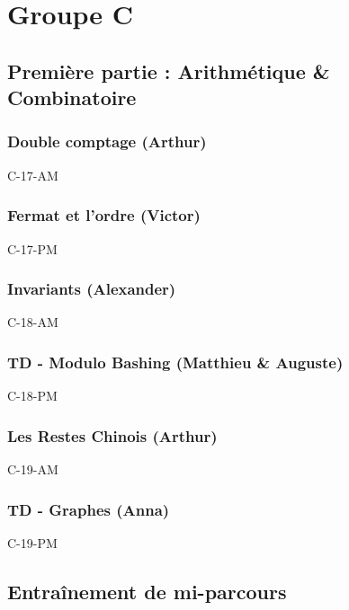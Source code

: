 \documentclass[poly,trombi]{valbonne}
\begin{document}
\chapter{Groupe C}

\minitoc \clearpage

\section{Première partie : Arithmétique \& Combinatoire}

\subsection{Double comptage (Arthur)}

{C-17-AM}

\subsection{Fermat et l'ordre (Victor)}

{C-17-PM}

\subsection{Invariants (Alexander)}

{C-18-AM}

\subsection{TD - Modulo Bashing (Matthieu \& Auguste)}

{C-18-PM}

\subsection{Les Restes Chinois (Arthur)}

{C-19-AM}

\subsection{TD - Graphes (Anna)}

{C-19-PM}


\section{Entraînement de mi-parcours}
\end{document}
